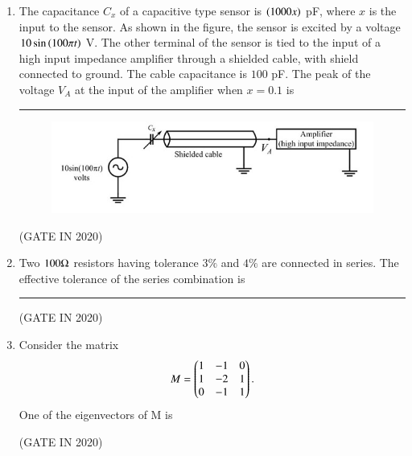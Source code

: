 \documentclass[journal,12pt,onecolumn]{IEEEtran}
\theoremstyle{remark}
\begin{document}
\begin{enumerate}
\item The capacitance $C_x$ of a capacitive type sensor is $\left(1000 x\right)$ pF, where $x$ is the input to the sensor. As shown in the figure, the sensor is excited by a voltage $10 \sin \left(100\pi t\right)$ V. The other terminal of the sensor is tied to the input of a high input impedance amplifier through a shielded cable, with shield connected to ground. The cable capacitance is $100$ pF. The peak of the voltage $V_A$ at the input of the amplifier when $x = 0.1$  is \rule{2cm}{0.4pt}
\begin{figure}[H]
\centering
\includegraphics[width=0.7\columnwidth]{figs/q12.jpg}
\caption*{}
\label{fig:q12}
\end{figure}

\hfill{(GATE IN 2020)}

\item Two $100\ohm$ resistors having tolerance $3\%$ and $4\%$ are connected in series. The effective tolerance of the series combination  is \rule{2cm}{0.4pt}

\hfill{(GATE IN 2020)}

\item Consider the matrix 
\begin{align*}
M = \begin{pmatrix}1 & -1 & 0 \\ 1 & -2 & 1 \\ 0 & -1 & 1\end{pmatrix}.
\end{align*}
 One of the eigenvectors of M is
 
\hfill{(GATE IN 2020)}
\begin{enumerate}
\end{enumerate}


\end{enumerate}
\end{document}
